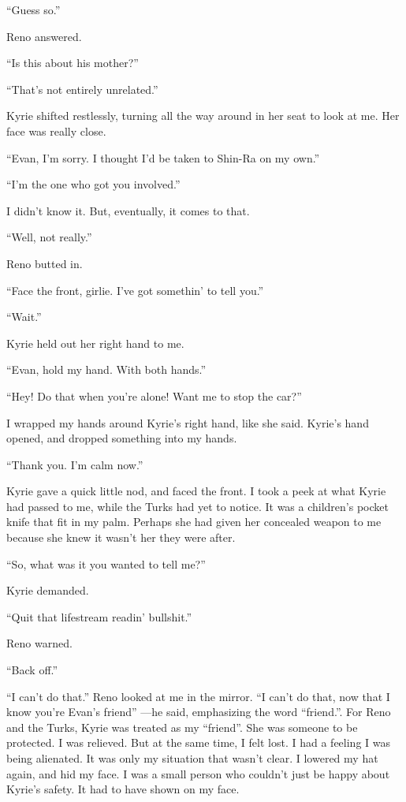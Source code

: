 \documentclass[oneside]{book}
\begin{document}
“Guess so.”

Reno answered.

“Is this about his mother?”

“That’s not entirely unrelated.”

Kyrie shifted restlessly, turning all the way around in her seat to look at me. Her face was really close.

“Evan, I’m sorry. I thought I’d be taken to Shin-Ra on my own.”

“I’m the one who got you involved.”

I didn’t know it. But, eventually, it comes to that.

“Well, not really.”

Reno butted in.

“Face the front, girlie. I’ve got somethin’ to tell you.”

“Wait.”

Kyrie held out her right hand to me.

“Evan, hold my hand. With both hands.”

“Hey! Do that when you’re alone! Want me to stop the car?”

I wrapped my hands around Kyrie’s right hand, like she said. Kyrie’s hand opened, and dropped something into my hands.

“Thank you. I’m calm now.”

Kyrie gave a quick little nod, and faced the front. I took a peek at what Kyrie had passed to me, while the Turks had yet to notice. It was a children’s pocket knife that fit in my palm. Perhaps she had given her concealed weapon to me because she knew it wasn’t her they were after.

“So, what was it you wanted to tell me?”

Kyrie demanded.

“Quit that lifestream readin’ bullshit.”

Reno warned.

“Back off.”

“I can’t do that.” Reno looked at me in the mirror. “I can’t do that, now that I know you’re Evan’s friend” —he said, emphasizing the word “friend.”. For Reno and the Turks, Kyrie was treated as my “friend”. She was someone to be protected. I was relieved. But at the same time, I felt lost. I had a feeling I was being alienated. It was only my situation that wasn’t clear. I lowered my hat again, and hid my face. I was a small person who couldn’t just be happy about Kyrie’s safety. It had to have shown on my face.
\end{document}
